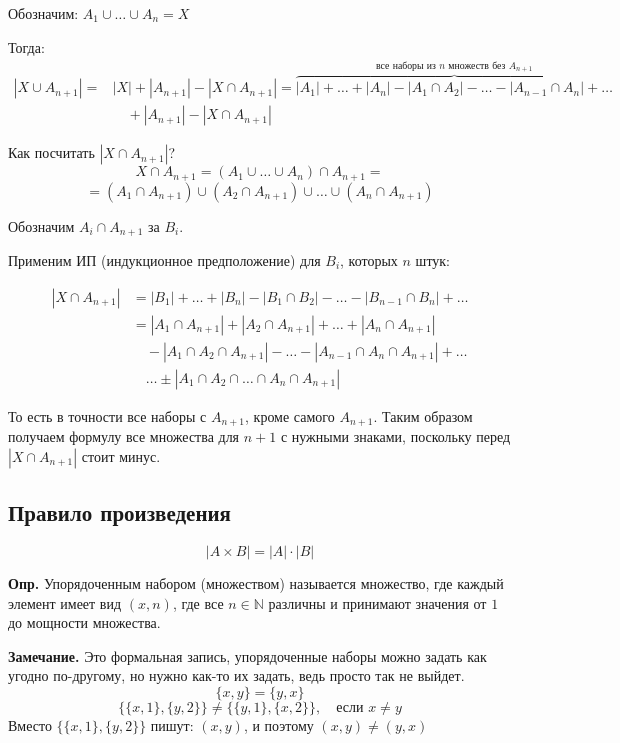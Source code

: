 \documentclass[10pt, a4paper]{article}
\begin{document}
Обозначим: $A_1 \cup \dots \cup A_n = X$

Тогда:
\[
\begin{aligned}
|X \cup A_{n+1}| ={} & |X| + |A_{n+1}| - |X \cap A_{n+1}| = \overbrace{|A_1| + \dots + |A_n| - |A_1 \cap A_2| - \dots - |A_{n-1} \cap A_n| + \dots}^{\text{все наборы из } n \text{ множеств без } A_{n+1}} \\
& \quad + |A_{n+1}| - |X \cap A_{n+1}|
\end{aligned}
\]


Как посчитать $|X \cap A_{n+1}|$?
$$X \cap A_{n+1} = (A_1 \cup \dots \cup A_n) \cap A_{n+1} =$$
$$= (A_1 \cap A_{n+1}) \cup (A_2 \cap A_{n+1}) \cup \dots \cup (A_n \cap A_{n+1})$$

Обозначим $A_i \cap A_{n+1}$ за $B_i$.

Применим ИП (индукционное предположение) для $B_i$, которых $n$ штук: 

\[
\begin{aligned}
|X \cap A_{n+1}| 
&= |B_1| + \dots + |B_n| - |B_1 \cap B_2| - \dots - |B_{n-1} \cap B_n| + \dots \\
&= |A_1 \cap A_{n+1}| + |A_2 \cap A_{n+1}| + \dots + |A_n \cap A_{n+1}| \\
&\quad- |A_1 \cap A_2 \cap A_{n+1}| - \dots - |A_{n-1} \cap A_n \cap A_{n+1}| + \dots \\
&\quad \dots \pm |A_1 \cap A_2 \cap \dots \cap A_n \cap A_{n+1}|
\end{aligned}
\]


То есть в точности все наборы с $A_{n+1}$, кроме самого $A_{n+1}$. Таким образом получаем формулу все множества для $n+1$ с нужными знаками, поскольку перед $|X \cap A_{n+1}|$ стоит минус.


\subsection*{Правило произведения}

$$|A \times B| = |A| \cdot |B|$$

\textbf{Опр.} Упорядоченным набором (множеством) называется множество, где каждый элемент имеет вид $(x, n)$, где все $n \in \mathbb{N}$ различны и принимают значения от $1$ до мощности множества.



\vspace{0.3cm}
\textbf{Замечание.}
Это формальная запись, упорядоченные наборы можно задать как угодно по-другому, но нужно как-то их задать, ведь просто так не выйдет.
$$\{x, y\} = \{y, x\}$$
$$\{\{x, 1\}, \{y, 2\}\} \neq \{\{y, 1\}, \{x, 2\}\}, \quad \text{если } x \neq y$$
\quad\quad Вместо $\{\{x, 1\}, \{y, 2\}\}$ пишут: $(x, y)$, и поэтому $(x, y) \neq (y, x)$
\end{document}
